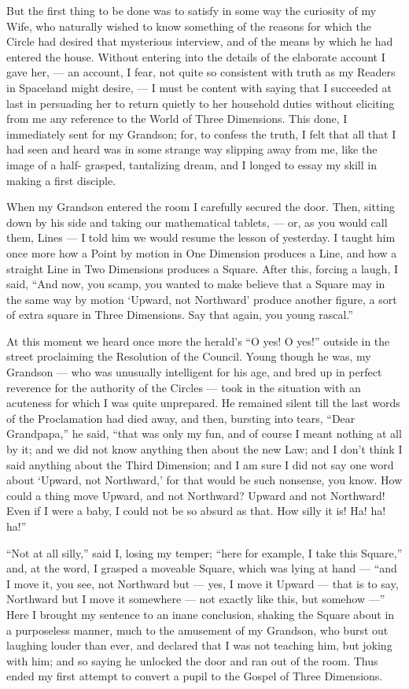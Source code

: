 \documentclass[10pt, kindle, oneside]{kindle}
\begin{document}
But the first thing to be done was to satisfy in some way the curiosity of my
Wife, who naturally wished to know something of the reasons for which the
Circle had desired that mysterious interview, and of the means by which he had
entered the house. Without entering into the details of the elaborate account
I gave her, --- an account, I fear, not quite so consistent with truth as my
Readers in Spaceland might desire, --- I must be content with saying that I
succeeded at last in persuading her to return quietly to her household duties
without eliciting from me any reference to the World of Three Dimensions. This
done, I immediately sent for my Grandson; for, to confess the truth, I felt
that all that I had seen and heard was in some strange way slipping away from
me, like the image of a half- grasped, tantalizing dream, and I longed to
essay my skill in making a first disciple.

When my Grandson entered the room I carefully secured the door. Then, sitting
down by his side and taking our mathematical tablets, --- or, as you would call
them, Lines --- I told him we would resume the lesson of yesterday. I taught him
once more how a Point by motion in One Dimension produces a Line, and how a
straight Line in Two Dimensions produces a Square. After this, forcing a
laugh, I said, ``And now, you scamp, you wanted to make believe that a Square
may in the same way by motion `Upward, not Northward' produce another figure,
a sort of extra square in Three Dimensions. Say that again, you young rascal.''

At this moment we heard once more the herald's ``O yes! O yes!'' outside in the
street proclaiming the Resolution of the Council. Young though he was, my
Grandson --- who was unusually intelligent for his age, and bred up in perfect
reverence for the authority of the Circles --- took in the situation with an
acuteness for which I was quite unprepared. He remained silent till the last
words of the Proclamation had died away, and then, bursting into tears, ``Dear
Grandpapa,'' he said, ``that was only my fun, and of course I meant nothing at
all by it; and we did not know anything then about the new Law; and I don't
think I said anything about the Third Dimension; and I am sure I did not say
one word about `Upward, not Northward,' for that would be such nonsense, you
know. How could a thing move Upward, and not Northward? Upward and not
Northward! Even if I were a baby, I could not be so absurd as that. How silly
it is! Ha! ha! ha!''

``Not at all silly,'' said I, losing my temper; ``here for example, I take this
Square,'' and, at the word, I grasped a moveable Square, which was lying at
hand --- ``and I move it, you see, not Northward but --- yes, I move it Upward ---
that is to say, Northward but I move it somewhere --- not exactly like this, but
somehow ---'' Here I brought my sentence to an inane conclusion, shaking the
Square about in a purposeless manner, much to the amusement of my Grandson,
who burst out laughing louder than ever, and declared that I was not teaching
him, but joking with him; and so saying he unlocked the door and ran out of
the room. Thus ended my first attempt to convert a pupil to the Gospel of
Three Dimensions.
\end{document}
